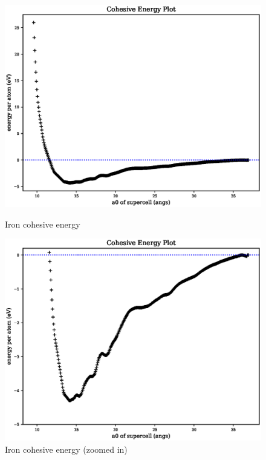 \begin{figure}[ht] 
  \begin{minipage}[b]{0.4\linewidth}
    \centering
    \includegraphics[width=.9\linewidth]{chapters/results_potential_fitting/pot_fepd_fcc_1/fe_cohesive_energy.eps} 
    \caption{Iron cohesive energy}  
    \label{fig:fev1cohesive}
  \end{minipage}%
  \begin{minipage}[b]{0.4\linewidth}
    \centering
    \includegraphics[width=.9\linewidth]{chapters/results_potential_fitting/pot_fepd_fcc_1/fe_cohesive_energy_zoom.eps} 
    \caption{Iron cohesive energy (zoomed in)}  
    \label{fig:fev1cohesivezoom}
  \end{minipage}%
\end{figure}

